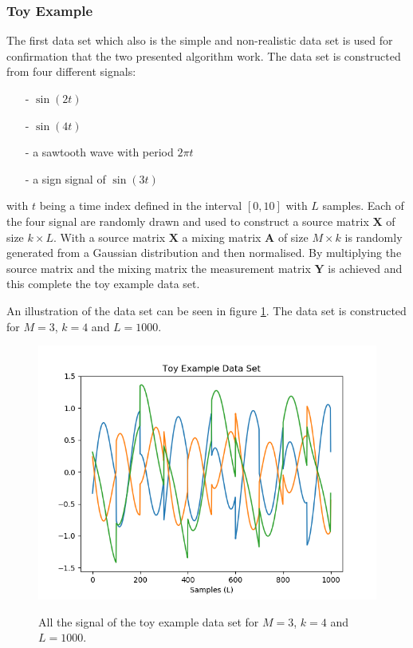 \subsubsection{Toy Example}
The first data set which also is the simple and non-realistic data set is used for confirmation that the two presented algorithm work.
The data set is constructed from four different signals: 
\begin{itemize}
\item[-] $\sin(2t)$
\item[-] $\sin(4t)$
\item[-] a sawtooth wave with period $2 \pi t$
\item[-] a sign signal of $\sin(3t)$
\end{itemize}
with $t$ being a time index defined in the interval $[0,10]$ with $L$ samples. Each of the four signal are randomly drawn and used to construct a source matrix $\mathbf{X}$ of size $k \times L$. 
With a source matrix $\mathbf{X}$ a mixing matrix $\mathbf{A}$ of size $M \times k$ is randomly generated from a Gaussian distribution and then normalised. By multiplying the source matrix and the mixing matrix the measurement matrix $\mathbf{Y}$ is achieved and this complete the toy example data set.

An illustration of the data set can be seen in figure \ref{fig:mix}. The data set is constructed for $M = 3$, $k = 4$ and $L = 1000$.
\begin{figure}[H]
\centering
\includegraphics[scale=0.5]{figures/chapter6/Mix_Data_m3_n4_k4_L1000.png}
\label{fig:mix}
\caption{All the signal of the toy example data set for $M = 3$, $k=4$ and $L=1000$.}
\end{figure}
\noindent

